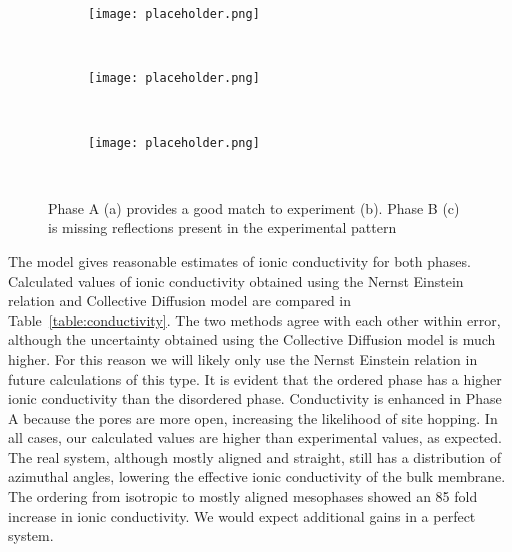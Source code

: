 	\begin{figure}
	\centering
	\begin{subfigure}{.3\textwidth}
		\centering
		\texttt{[image: placeholder.png]}
		\caption{~\label{fig:xrdA}}
	\end{subfigure}
	\begin{subfigure}{.3\textwidth}
		\centering
		\texttt{[image: placeholder.png]}
		\caption{~\label{fig:xrdexp}}
	\end{subfigure}
        \begin{subfigure}{.3\textwidth}
                \centering
                \texttt{[image: placeholder.png]}
                \caption{~\label{fig:xrdB}}
        \end{subfigure}
	\caption{Phase A (a) provides a good match to experiment (b). Phase B (c) is missing reflections present in the experimental pattern} %
	\label{fig:xrd}
	\end{figure}

The model gives reasonable estimates of ionic conductivity for both phases.
Calculated values of ionic conductivity obtained using the Nernst Einstein
relation and Collective Diffusion model are compared in Table~\ref{table:conductivity}.
The two methods agree with each other within error, although the 
uncertainty obtained using the Collective Diffusion model is much higher.
For this reason we will likely only use the Nernst Einstein relation
in future calculations of this type. It is evident that the ordered 
phase has a higher ionic conductivity than the disordered phase. 
Conductivity is enhanced in Phase A because the pores are more open,
increasing the likelihood of site hopping. In all cases, our calculated values
are higher than experimental values, as expected. The real system, 
although mostly aligned and straight, still has a distribution of 
azimuthal angles, lowering the effective ionic conductivity of the bulk 
membrane. The ordering from isotropic to mostly aligned mesophases 
showed an 85 fold increase in ionic conductivity. We would expect additional
gains in a perfect system.

